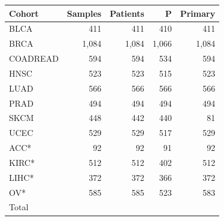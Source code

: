 \begin{tabular}{@{}lrrrr@{}}
\toprule
Cohort & Samples & Patients & P & Primary\\
\midrule
BLCA & 411 & 411 & 410 & 411 \\
BRCA & 1,084 & 1,084 & 1,066 & 1,084 \\
COADREAD & 594 & 594 & 534 & 594 \\
HNSC & 523 & 523 & 515 & 523 \\
LUAD & 566 & 566 & 566 & 566 \\
PRAD & 494 & 494 & 494 & 494 \\
SKCM & 448 & 442 & 440 & 81 \\
UCEC & 529 & 529 & 517 & 529 \\
ACC* & 92 & 92 & 91 & 92 \\
KIRC* & 512 & 512 & 402 & 512 \\
LIHC* & 372 & 372 & 366 & 372 \\
OV* & 585 & 585 & 523 & 583 \\
\midrule
Total & \SampleCount{} & \PatientCount{} & \ProfiledSampleCount{} & \PrimarySampleCount{}\\
\bottomrule
\end{tabular}
